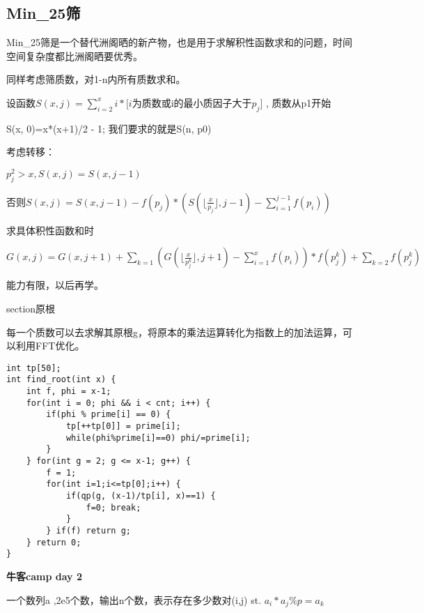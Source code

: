 \subsection{Min\_25筛}

Min\_25筛是一个替代洲阁晒的新产物，也是用于求解积性函数求和的问题，时间空间复杂度都比洲阁晒要优秀。

同样考虑筛质数，对1-n内所有质数求和。

设函数$S(x, j)=\sum_{i=2}^xi*[i$为质数或i的最小质因子大于$p_j]$ , 质数从p1开始

S(x, 0)=x*(x+1)/2 - 1; 我们要求的就是S(n, p0)

考虑转移：

$ p^2_j > x, S(x, j) = S(x, j-1) $

否则$ S(x,j)=S(x,j-1)-f(p_j)*(S(\lfloor \frac{x}{p_j} \rfloor,j-1)-\sum_{i=1}^{j-1}f(p_i)) $

求具体积性函数和时

$G(x,j)=G(x,j+1)+\sum_{k=1}(G(\lfloor\frac{x}{p_j^k}\rfloor,j+1)-\sum_{i=1}^xf(p_i) )*f(p_j^k)+\sum_{k=2}f(p_j^k)$

能力有限，以后再学。



section{原根}

每一个质数可以去求解其原根g，将原本的乘法运算转化为指数上的加法运算，可以利用FFT优化。


\begin{lstlisting}
int tp[50];
int find_root(int x) {
    int f, phi = x-1;
    for(int i = 0; phi && i < cnt; i++) {
        if(phi % prime[i] == 0) {
            tp[++tp[0]] = prime[i];
            while(phi%prime[i]==0) phi/=prime[i];
        }
    } for(int g = 2; g <= x-1; g++) {
        f = 1;
        for(int i=1;i<=tp[0];i++) {
            if(qp(g, (x-1)/tp[i], x)==1) {
                f=0; break;
            }
        } if(f) return g;
    } return 0;
}
\end{lstlisting}

{\bfseries 牛客camp day 2}

一个数列a ,2e5个数，输出n个数，表示存在多少数对(i,j) st.   $a_i * a_j \% p = a_k$

